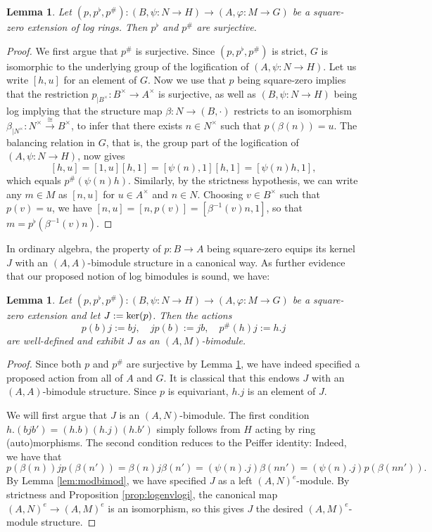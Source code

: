 \documentclass[a4paper,10pt%
]{amsart}
\numberwithin{equation}{section}
\newtheorem{lemma}[subsection]{Lemma}
\theoremstyle{definition}
\renewcommand{\:}{\colon}
\begin{document}
\begin{lemma}\label{lem:psharpsurj} Let $(p, p^\flat, p^\#) \colon (B, \psi \colon N \to H) \to (A, \varphi \colon M \to G)$ be a square-zero extension of log rings. Then $p^\flat$ and $p^\#$ are surjective. 
\end{lemma}

\begin{proof} We first argue that $p^\#$ is surjective. Since $(p, p^\flat, p^\#)$ is strict, $G$ is isomorphic to the underlying group of the logification of $(A, \psi \colon N \to H)$. Let us write $[h, u]$ for an element of $G$. Now we use that $p$ being square-zero implies that the restriction $p_{|B^\times} \colon B^\times \to A^\times$ is surjective, as well as $(B, \psi \colon N \to H)$ being log implying that the structure map $\beta \colon N \to (B, \cdot)$ restricts to an isomorphism $\beta_{|N^\times} \colon N^\times \xrightarrow{\cong} B^\times$, to infer that there exists $n \in N^\times$ such that $p(\beta(n)) = u$. The balancing relation in $G$, that is, the group part of the logification of $(A, \psi \colon N \to H)$, now gives \[[h, u] = [1, u][h, 1] = [\psi(n), 1][h, 1] = [\psi(n)h, 1],\] which equals $p^{\#}(\psi(n)h)$.  Similarly, by the strictness hypothesis, we can write any $m \in M$ as $[n, u]$ for $u \in A^\times$ and $n \in N$. Choosing $v \in B^\times$ such that $p(v) = u$, we have $[n, u] = [n, p(v)] = [\beta^{-1}(v)n, 1]$, so that $m = p^\flat(\beta^{-1}(v)n)$.
\end{proof}

In ordinary algebra, the property of $p \colon B \to A$ being square-zero equips its kernel $J$ with an $(A, A)$-bimodule structure in a canonical way. As further evidence that our proposed notion of log bimodules is sound, we have:

\begin{lemma}\label{lem:sqzerobimod1} Let $(p, p^\flat, p^\#) \colon (B, \psi \colon N \to H) \to (A, \varphi \colon M \to G)$ be a square-zero extension and let $J := {\rm ker}(p)$. Then the actions \[p(b)j := bj, \quad jp(b) := jb, \quad p^\#(h)j := h.j\] are well-defined and exhibit $J$ as an $(A, M)$-bimodule.   
\end{lemma}

\begin{proof} Since both $p$ and $p^\#$ are surjective by Lemma \ref{lem:psharpsurj}, we have indeed specified a proposed action from all of $A$ and $G$. It is classical that this endows $J$ with an $(A, A)$-bimodule structure. Since $p$ is equivariant, $h.j$ is an element of $J$. 

We will first argue that $J$ is an $(A, N)$-bimodule. The first condition $h.(bjb') = (h.b)(h.j)(h.b')$ simply follows from $H$ acting by ring (auto)morphisms. The second condition reduces to the Peiffer identity: Indeed, we have that \[p(\beta(n))jp(\beta(n')) = \beta(n)j\beta(n') = (\psi(n).j)\beta(nn') = (\psi(n).j)p(\beta(nn')).\] By Lemma \ref{lem:modbimod}, we have specified $J$ as a left $(A, N)^e$-module. By strictness and Proposition \ref{prop:logenvlogi}, the canonical map $(A, N)^e \to (A, M)^e$ is an isomorphism, so this gives $J$ the desired $(A, M)^e$-module structure. 
\end{proof}
\end{document}
